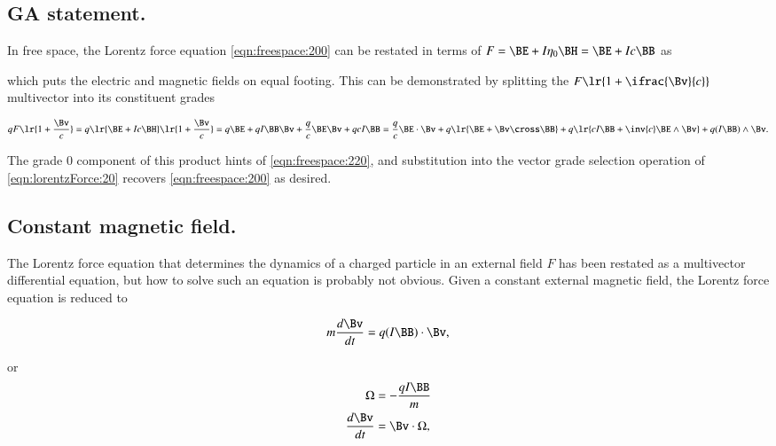 %
%
\subsection{GA statement.}
In free space, the Lorentz force equation \cref{eqn:freespace:200}
can be restated
in terms of \( F = \BE + I \eta_0 \BH = \BE + I c \BB \) as


which puts the electric and magnetic fields on equal footing.
This can be demonstrated by splitting the \( F \lr{ 1 + \ifrac{\Bv}{c} } \) multivector into its constituent grades

\begin{dmath}\label{eqn:lorentzForce:40}
q F \lr{ 1 + \frac{\Bv}{c} }
=
q
\lr{ \BE + I c \BH }
\lr{ 1 + \frac{\Bv}{c} }
=
q \BE
+ q I \BB \Bv
+ \frac{q}{c} \BE \Bv
+ q c I \BB
=
  \frac{q}{c} \BE \cdot \Bv
+ q \lr{ \BE + \Bv \cross \BB }
+ q \lr{ c I \BB + \inv{c} \BE \wedge \Bv }
+ q (I \BB) \wedge \Bv.
\end{dmath}

The grade 0 component of this product hints of \cref{eqn:freespace:220}, and substitution into the vector grade selection operation of \cref{eqn:lorentzForce:20} recovers \cref{eqn:freespace:200} as desired.

\subsection{Constant magnetic field.}

The Lorentz force equation that determines the dynamics of a charged particle in an external field \( F \) has been restated as a multivector differential equation, but how to solve such an equation is probably not obvious.
Given a constant external magnetic field, the Lorentz force equation is reduced to

\begin{dmath}\label{eqn:lorentzForce:60}
m \frac{d\Bv}{dt} = q (I \BB) \cdot \Bv,
\end{dmath}

or
\begin{dmath}\label{eqn:lorentzForce:80}
\begin{aligned}
\Omega &= -\frac{q I \BB}{m} \\
\frac{d\Bv}{dt} &= \Bv \cdot \Omega,
\end{aligned}
\end{dmath}


